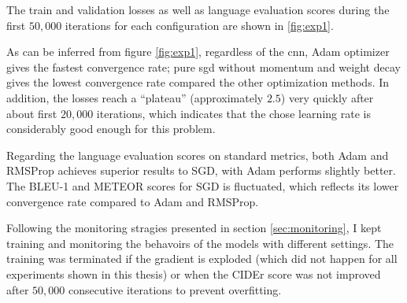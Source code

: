 The train and validation losses as well as language evaluation scores during the first $50,000$ iterations for each configuration are shown in \ref{fig:exp1}. 

As can be inferred from figure \ref{fig:exp1}, regardless of the \gls{cnn}, Adam optimizer gives the fastest convergence rate; pure \gls{sgd} without momentum and weight decay gives the lowest convergence rate compared the other optimization methods. In addition, the losses reach a ``plateau'' (approximately $2.5$) very quickly after about first $20,000$ iterations, which indicates that the chose learning rate is considerably good enough for this problem.  

Regarding the language evaluation scores on standard metrics, both Adam and RMSProp achieves superior results to SGD, with Adam performs slightly better. The BLEU-1 and METEOR scores for SGD is fluctuated, which reflects its lower convergence rate compared to Adam and RMSProp.

Following the monitoring stragies presented in section \ref{sec:monitoring}, I kept training and monitoring the behavoirs of the models with different settings. The training was terminated if the gradient is exploded (which did not happen for all experiments shown in this thesis) or when the CIDEr score was not improved after $50,000$ consecutive iterations to prevent overfitting. 

